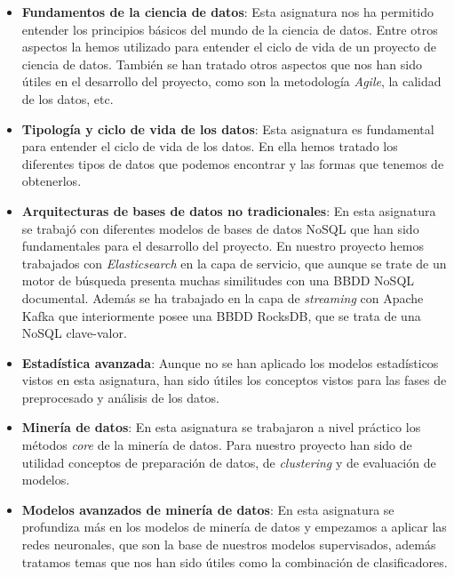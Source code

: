 \begin{itemize}

\item \textbf{Fundamentos de la ciencia de datos}: Esta asignatura nos ha permitido entender los principios básicos del mundo de la ciencia de datos. Entre otros aspectos la hemos utilizado para entender el ciclo de vida de un proyecto de ciencia de datos. También se han tratado otros aspectos que nos han sido útiles en el desarrollo del proyecto, como son la metodología \textit{Agile}, la calidad de los datos, etc.

\item \textbf{Tipología y ciclo de vida de los datos}: Esta asignatura es fundamental para entender el ciclo de vida de los datos. En ella hemos tratado los diferentes tipos de datos que podemos encontrar y las formas que tenemos de obtenerlos.

\item \textbf{Arquitecturas de bases de datos no tradicionales}: En esta asignatura se trabajó con diferentes  modelos de bases de datos NoSQL que han sido fundamentales para el desarrollo del proyecto. En nuestro proyecto hemos trabajados con \textit{Elasticsearch} en la capa de servicio, que aunque se trate de un motor de búsqueda presenta muchas similitudes con una BBDD NoSQL documental. Además se ha trabajado en la capa de \textit{streaming} con Apache Kafka que interiormente posee una BBDD RocksDB, que se trata de una NoSQL clave-valor. 

\item \textbf{Estadística avanzada}: Aunque no se han aplicado los modelos estadísticos vistos en esta asignatura, han  sido útiles los conceptos vistos para las fases de preprocesado y análisis de los datos.



\item \textbf{Minería de datos}: En esta asignatura se trabajaron a nivel práctico los métodos \textit{core} de la minería de datos. Para nuestro proyecto han sido de utilidad conceptos de preparación de datos, de \textit{clustering} y de evaluación de modelos. 

\item \textbf{Modelos avanzados de minería de datos}: En esta asignatura se profundiza más en los modelos de minería de datos y empezamos a aplicar las redes neuronales, que son la base de nuestros modelos supervisados, además tratamos temas que nos han sido útiles como la combinación de clasificadores.



\end{itemize}
